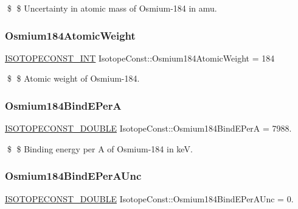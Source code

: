 \$ \$ Uncertainty in atomic mass of Osmium-\/184 in amu. \mbox{\label{group___isotope_const-_osmium-_os184_ga36e4116f18b4cf6555d6ec2b642502e4}} 
\subsubsection{\texorpdfstring{Osmium184\+Atomic\+Weight}{Osmium184AtomicWeight}}
{\footnotesize\ttfamily \mbox{\hyperlink{group___isotope_const-_macros_ga5f18360b3e99483a35c32d789e62621c}{I\+S\+O\+T\+O\+P\+E\+C\+O\+N\+S\+T\+\_\+\+I\+NT}} Isotope\+Const\+::\+Osmium184\+Atomic\+Weight = 184}

\$ \$ Atomic weight of Osmium-\/184. \mbox{\label{group___isotope_const-_osmium-_os184_ga6f1ae4764111f9808091c415b4d94be6}} 
\subsubsection{\texorpdfstring{Osmium184\+Bind\+E\+PerA}{Osmium184BindEPerA}}
{\footnotesize\ttfamily \mbox{\hyperlink{group___isotope_const-_macros_ga8f45a7272ce02c0b4c65c44636ed719a}{I\+S\+O\+T\+O\+P\+E\+C\+O\+N\+S\+T\+\_\+\+D\+O\+U\+B\+LE}} Isotope\+Const\+::\+Osmium184\+Bind\+E\+PerA = 7988.}

\$ \$ Binding energy per A of Osmium-\/184 in keV. \mbox{\label{group___isotope_const-_osmium-_os184_gad9c5aa5349e6854cf09a06644e56771a}} 
\subsubsection{\texorpdfstring{Osmium184\+Bind\+E\+Per\+A\+Unc}{Osmium184BindEPerAUnc}}
{\footnotesize\ttfamily \mbox{\hyperlink{group___isotope_const-_macros_ga8f45a7272ce02c0b4c65c44636ed719a}{I\+S\+O\+T\+O\+P\+E\+C\+O\+N\+S\+T\+\_\+\+D\+O\+U\+B\+LE}} Isotope\+Const\+::\+Osmium184\+Bind\+E\+Per\+A\+Unc = 0.}

